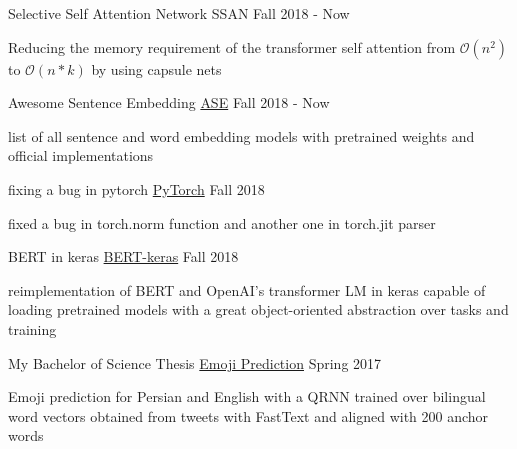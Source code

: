 

\begin{cventries}

\cventry
    {Selective Self Attention Network} %
    {SSAN} %
    {} %
    {Fall 2018 - Now} %
    {
      \begin{cvitems} %
        \item {Reducing the memory requirement of the transformer self attention from $\mathcal{O}(n^{2})$ to $\mathcal{O}(n*k)$ by using capsule nets}
      \end{cvitems}
    }

\cventry
    {Awesome Sentence Embedding} %
    {\href{https://github.com/Separius/awesome-sentence-embedding}{ASE}} %
    {} %
    {Fall 2018 - Now} %
    {
      \begin{cvitems} %
        \item {list of all sentence and word embedding models with pretrained weights and official implementations}
      \end{cvitems}
    }
    
\cventry
	{fixing a bug in pytorch}
	{\href{https://github.com/pytorch/pytorch/pull/12722}{PyTorch}}
	{}
	{Fall 2018}
	{
		\begin{cvitems}
			\item {fixed a bug in torch.norm function and another one in torch.jit parser}
		\end{cvitems}
	}
    
\cventry
	{BERT in keras}
	{\href{https://github.com/Separius/BERT-keras}{BERT-keras}}
	{}
	{Fall 2018}
	{
		\begin{cvitems}
			\item {reimplementation of BERT and OpenAI's transformer LM in keras capable of loading pretrained models with a great object-oriented abstraction over tasks and training}
		\end{cvitems}
	}

\cventry
    {My Bachelor of Science Thesis} %
    {\href{https://github.com/Separius/EmojiPrediction}{Emoji Prediction}} %
    {} %
    {Spring 2017} %
    {
      \begin{cvitems} %
        \item {Emoji prediction for Persian and English with a QRNN trained over bilingual word vectors obtained from tweets with FastText and aligned with 200 anchor words}
      \end{cvitems}
    }


\end{cventries}
